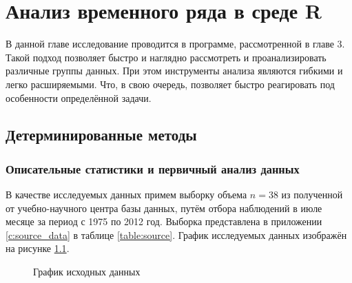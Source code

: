 
\newcommand{\inp}[1]{}
\newcommand{\characteristic}[2]{\inp{#1/characteristics/#2}}
\newcommand{\descriptive}[2]{\inp{#1/descriptive/#2}}
\newcommand{\test}[3]{\inp{#1/test/#2/#3}}
\newcommand{\normaldistr}{$\mathcal{N}(\descriptive{original}{mean}, \descriptive{original}{variance})$}
\newcommand{\resnormaldistr}{$\mathcal{N}(\descriptive{residual}{mean}, \descriptive{residual}{variance})$}

\newpage

\chapter{Анализ временного ряда в среде R}

В данной главе исследование проводится в программе, рассмотренной в главе 3. Такой подход позволяет быстро и наглядно рассмотреть и проанализировать различные группы данных. При этом инструменты анализа являются гибкими и легко расширяемыми. Что, в свою очередь, позволяет быстро реагировать под особенности определённой задачи.

\section{Детерминированные методы} %
\label{sec:determenistic}

\subsection{Описательные статистики и первичный анализ данных} %
\label{sec:basis}

В качестве исследуемых данных примем выборку объема $ n = 38 $ из полученной от учебно-научного центра базы данных, путём отбора наблюдений в июле месяце за период с 1975 по 2012 год. Выборка представлена в приложении \ref{c:source_data} в таблице \ref{table:source}. График исследуемых данных изображён на рисунке \ref{img:input}.
\begin{figure}[ht]
\caption{График исходных данных}
\label{img:input}
\end{figure}

